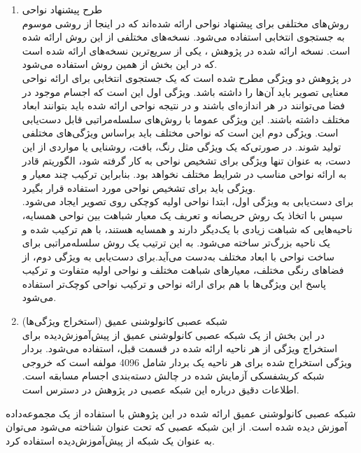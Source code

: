 \begin{enumerate}
	\item طرح پیشنهاد نواحی\\
	روش‌های مختلفی برای پیشنهاد نواحی ارائه شده‌اند که در اینجا از روشی موسوم به جستجوی انتخابی استفاده می‌شود. نسخه‌های مختلفی از این روش ارائه شده است. نسخه ارائه شده در پژوهش
	\cite{uijlings2013selective}،
	یکی از سریع‌ترین نسخه‌های ارائه شده است که در این بخش از همین روش استفاده می‌شود.
	\\
	در پژوهش 
	\cite{uijlings2013selective}
	دو ویژگی‌ مطرح شده است که یک جستجوی انتخابی برای ارائه نواحی معنایی تصویر باید آن‌ها را داشته باشد. ویژگی اول این است که اجسام موجود در فضا می‌توانند در هر اندازه‌ای باشند و در نتیجه نواحی ارائه شده باید بتوانند ابعاد مختلف داشته باشند. این ویژگی عموما با روش‌های سلسله‌مراتبی قابل دست‌یابی است. ویژگی دوم این است که نواحی مختلف باید براساس  ویژگی‌های مختلفی تولید شوند. در صورتی‌که یک ویژگی مثل رنگ، بافت، روشنایی یا مواردی از این دست، به عنوان تنها ویژگی برای تشخیص نواحی به کار گرفته شود، الگوریتم قادر به ارائه نواحی مناسب در شرایط مختلف نخواهد بود. بنابراین ترکیب چند معیار و ویژگی باید برای تشخیص نواحی مورد استفاده قرار بگیرد. 
	\\
	برای دست‌یابی به ویژگی اول، ابتدا نواحی اولیه کوچکی روی تصویر ایجاد می‌شود. سپس با اتخاذ یک روش حریصانه و تعریف یک معیار شباهت بین نواحی همسایه، ناحیه‌هایی که شباهت زیادی با یک‌دیگر دارند و همسایه هستند، با هم ترکیب شده و یک ناحیه بزرگ‌تر ساخته می‌شود. به این ترتیب یک روش سلسله‌مراتبی برای ساخت نواحی با ابعاد مختلف به‌دست ‌می‌آید.برای دست‌یابی به ویژگی دوم، از فضاهای رنگی مختلف، معیارهای شباهت مختلف و نواحی اولیه متفاوت و ترکیب پاسخ این ویژگی‌ها با هم برای ارائه نواحی و ترکیب نواحی کوچک‌تر استفاده می‌شود.
	
	\item شبکه عصبی کانولوشنی عمیق (استخراج ویژگی‌ها)\\
	در این بخش از یک شبکه عصبی کانولوشنی عمیق از پیش‌آموزش‌دیده‌ برای استخراج ویژگی ‌از هر ناحیه ارائه شده در قسمت قبل، استفاده می‌شود. بردار ویژگی استخراج شده برای هر ناحیه یک بردار شامل 4096 مولفه است که خروجی شبکه کریشفسکی
	آزمایش شده در چالش دسته‌بندی اجسام مسابقه   است. اطلاعات دقیق درباره این شبکه عصبی در پژوهش 
	\cite{krizhevsky2012imagenet}
	در دسترس است.
	
\end{enumerate}

شبکه عصبی کانولوشنی عمیق ارائه شده در این پژوهش با استفاده از یک مجموعه‌داده آموزش دیده شده است. از این شبکه عصبی که تحت عنوان  شناخته می‌شود می‌توان به عنوان یک شبکه از پیش‌آموزش‌دیده استفاده کرد.

